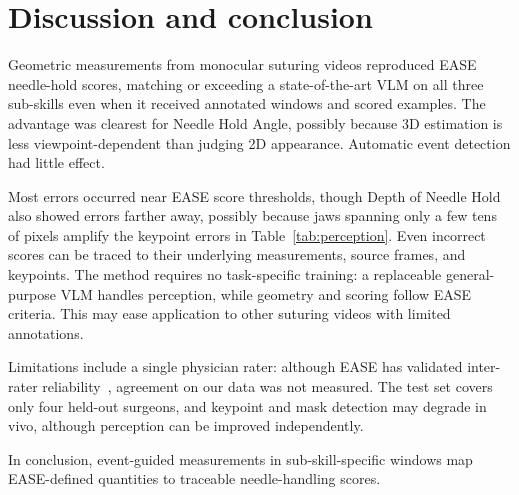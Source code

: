 \section{Discussion and conclusion}
\label{sec:discussion_conclusion}

Geometric measurements from monocular suturing videos reproduced EASE
needle-hold scores, matching or exceeding a state-of-the-art VLM on all
three sub-skills even when it received annotated windows and scored examples.
The advantage was clearest for Needle Hold Angle, possibly because 3D
estimation is less viewpoint-dependent than judging 2D appearance. Automatic
event detection had little effect.

Most errors occurred near EASE score thresholds, though Depth of Needle Hold
also showed errors farther away, possibly because jaws spanning only a few
tens of pixels amplify the keypoint errors in Table~\ref{tab:perception}. Even incorrect scores can be traced to
their underlying measurements, source frames, and keypoints. The method
requires no task-specific training: a replaceable general-purpose VLM handles
perception, while geometry and scoring follow EASE criteria. This may ease
application to other suturing videos with limited annotations.

Limitations include a single physician rater: although EASE has
validated inter-rater reliability~\cite{Haque2022}, agreement on our data was
not measured. The test set covers only four held-out surgeons, and keypoint
and mask detection may degrade in vivo, although perception can be improved
independently.

In conclusion, event-guided measurements in sub-skill-specific windows map
EASE-defined quantities to traceable needle-handling scores.
